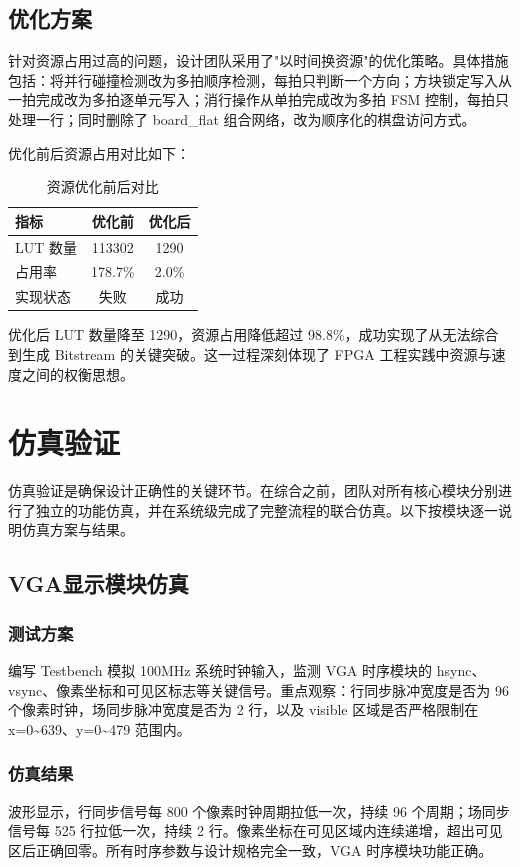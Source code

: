 \documentclass[UTF8,zihao=-4]{ctexart}
\begin{document}
\subsection{优化方案}
针对资源占用过高的问题，设计团队采用了"以时间换资源"的优化策略。具体措施包括：将并行碰撞检测改为多拍顺序检测，每拍只判断一个方向；方块锁定写入从一拍完成改为多拍逐单元写入；消行操作从单拍完成改为多拍 FSM 控制，每拍只处理一行；同时删除了 board\_flat 组合网络，改为顺序化的棋盘访问方式。

优化前后资源占用对比如下：

\begin{table}[H]
\centering
\begin{tabular}{lcc}
\toprule
指标 & 优化前 & 优化后 \\
\midrule
LUT 数量 & 113302 & 1290 \\
占用率 & 178.7\% & 2.0\% \\
实现状态 & 失败 & 成功 \\
\bottomrule
\end{tabular}
\caption{资源优化前后对比}
\end{table}

优化后 LUT 数量降至 1290，资源占用降低超过 98.8\%，成功实现了从无法综合到生成 Bitstream 的关键突破。这一过程深刻体现了 FPGA 工程实践中资源与速度之间的权衡思想。

\section{仿真验证}

仿真验证是确保设计正确性的关键环节。在综合之前，团队对所有核心模块分别进行了独立的功能仿真，并在系统级完成了完整流程的联合仿真。以下按模块逐一说明仿真方案与结果。

\subsection{VGA显示模块仿真}

\subsubsection{测试方案}
编写 Testbench 模拟 100MHz 系统时钟输入，监测 VGA 时序模块的 hsync、vsync、像素坐标和可见区标志等关键信号。重点观察：行同步脉冲宽度是否为 96 个像素时钟，场同步脉冲宽度是否为 2 行，以及 visible 区域是否严格限制在 x=0\textasciitilde639、y=0\textasciitilde479 范围内。

\subsubsection{仿真结果}
波形显示，行同步信号每 800 个像素时钟周期拉低一次，持续 96 个周期；场同步信号每 525 行拉低一次，持续 2 行。像素坐标在可见区域内连续递增，超出可见区后正确回零。所有时序参数与设计规格完全一致，VGA 时序模块功能正确。
\end{document}
